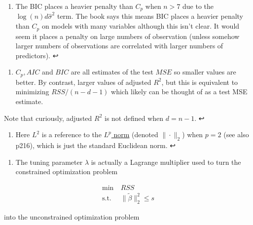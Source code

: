 \documentclass[11pt]{article}
\providecommand{\tightlist}{%
      \setlength{\itemsep}{0pt}\setlength{\parskip}{0pt}}
\begin{document}
\hypertarget{foot43}{}
\begin{enumerate}
\def\labelenumi{\arabic{enumi}.}
\setcounter{enumi}{42}
\tightlist
\item
  The BIC places a heavier penalty than \(C_p\) when \(n > 7\) due to
  the \(\log(n)d\hat{\sigma}^2\) term. The book says this means BIC
  places a heavier penalty than \(C_p\) on models with many variables
  although this isn't clear. It would seem it places a penalty on large
  numbers of observation (unless somehow larger numbers of observations
  are correlated with larger numbers of predictors). ↩
\end{enumerate}

\hypertarget{foot44}{}
\begin{enumerate}
\def\labelenumi{\arabic{enumi}.}
\setcounter{enumi}{43}
\tightlist
\item
  \(C_p, AIC\) and \(BIC\) are all estimates of the test \(MSE\) so
  smaller values are better. By contrast, larger values of adjusted
  \(R^2\), but this is equivalent to minimizing \(RSS/(n - d - 1)\)
  which likely can be thought of as a test MSE estimate.
\end{enumerate}

Note that curiously, adjusted \(R^2\) is not defined when \(d = n - 1\).
↩

\hypertarget{foot45}{}
\begin{enumerate}
\def\labelenumi{\arabic{enumi}.}
\setcounter{enumi}{44}
\tightlist
\item
  Here \(L^2\) is a reference to the
  \href{https://en.wikipedia.org/wiki/Lp_space}{\(L^p\) norm} (denoted
  \(\| \cdot \|_2\)) when \(p=2\) (see also p216), which is just the
  standard Euclidean norm. ↩
\end{enumerate}

\hypertarget{foot46}{}
\begin{enumerate}
\def\labelenumi{\arabic{enumi}.}
\setcounter{enumi}{45}
\tightlist
\item
  The tuning parameter \(\lambda\) is actually a Lagrange multiplier
  used to turn the constrained optimization problem
\end{enumerate}

\[
\begin{align*}
\min&\ RSS\\
\text{s.t.}&\ \| \tilde{\beta} \|_2^2 \leqslant s
\end{align*}
\]

into the unconstrained optimization problem
\end{document}
